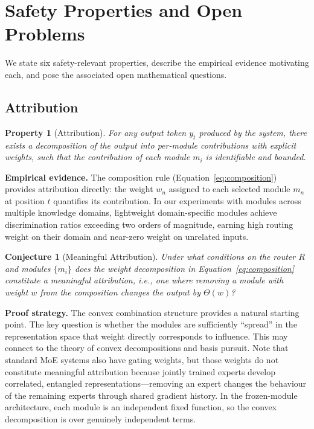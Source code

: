 \documentclass[11pt,a4paper]{article}
\newtheorem{property}{Property}
\newtheorem{conjecture}{Conjecture}
\begin{document}
\section{Safety Properties and Open Problems}
\label{sec:properties}

We state six safety-relevant properties, describe the empirical evidence motivating each, and pose the associated open mathematical questions.

\subsection{Attribution}
\label{sec:attribution}

\begin{property}[Attribution]
For any output token $y_t$ produced by the system, there exists a decomposition of the output into per-module contributions with explicit weights, such that the contribution of each module $m_i$ is identifiable and bounded.
\end{property}

\noindent\textbf{Empirical evidence.} The composition rule (Equation~\ref{eq:composition}) provides attribution directly: the weight $w_n$ assigned to each selected module $m_n$ at position $t$ quantifies its contribution. In our experiments with modules across multiple knowledge domains, lightweight domain-specific modules achieve discrimination ratios exceeding two orders of magnitude, earning high routing weight on their domain and near-zero weight on unrelated inputs.

\begin{conjecture}[Meaningful Attribution]
Under what conditions on the router $R$ and modules $\{m_i\}$ does the weight decomposition in Equation~\ref{eq:composition} constitute a \emph{meaningful} attribution, i.e., one where removing a module with weight $w$ from the composition changes the output by $\Theta(w)$?
\end{conjecture}

\noindent\textbf{Proof strategy.} The convex combination structure provides a natural starting point. The key question is whether the modules are sufficiently ``spread'' in the representation space that weight directly corresponds to influence. This may connect to the theory of convex decompositions and basis pursuit. Note that standard MoE systems also have gating weights, but those weights do not constitute meaningful attribution because jointly trained experts develop correlated, entangled representations---removing an expert changes the behaviour of the remaining experts through shared gradient history. In the frozen-module architecture, each module is an independent fixed function, so the convex decomposition is over genuinely independent terms.
\end{document}
